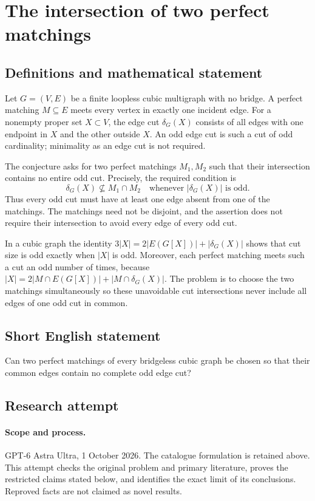 \documentclass[11pt,a4paper]{article}
\begin{document}
\section*{The intersection of two perfect matchings}\label{statement}

\subsection{Definitions and mathematical statement}
Let $G=(V,E)$ be a finite loopless cubic multigraph with
no bridge. A perfect matching $M\subseteq E$ meets every
vertex in exactly one incident edge. For a nonempty proper
set $X\subset V$, the edge cut $\delta_G(X)$ consists of
all edges with one endpoint in $X$ and the other outside
$X$. An odd edge cut is such a cut of odd cardinality;
minimality as an edge cut is not required.

The conjecture asks for two perfect matchings $M_1,M_2$
such that their intersection contains no entire odd cut.
Precisely, the required condition is
\[
 \delta_G(X)\not\subseteq M_1\cap M_2
 \quad\text{whenever }|\delta_G(X)|\text{ is odd}.
\]
Thus every odd cut must have at least one edge absent
from one of the matchings. The matchings need not be
disjoint, and the assertion does not require their
intersection to avoid every edge of every odd cut.

In a cubic graph the identity
$3|X|=2|E(G[X])|+|\delta_G(X)|$ shows that cut size is
odd exactly when $|X|$ is odd. Moreover, each perfect
matching meets such a cut an odd number of times, because
$|X|=2|M\cap E(G[X])|+|M\cap\delta_G(X)|$.
The problem is to choose the two matchings simultaneously
so these unavoidable cut intersections never include
all edges of one odd cut in common.
\subsection{Short English statement}
Can two perfect matchings of every bridgeless cubic graph be chosen so that their common edges contain no complete odd edge cut?
\subsection{Research attempt}
\paragraph{Scope and process.}
GPT-6 Astra Ultra, 1 October 2026. The catalogue formulation is retained above. This attempt checks the original problem and primary literature, proves the restricted claims stated below, and identifies the exact limit of its conclusions. Reproved facts are not claimed as novel results.
\end{document}
